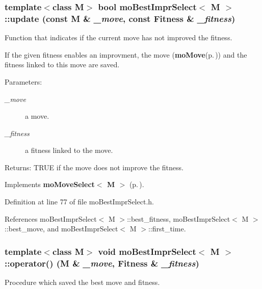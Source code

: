 \subsubsection{\setlength{\rightskip}{0pt plus 5cm}template$<$class M$>$ bool {\bf mo\-Best\-Impr\-Select}$<$ M $>$::update (const M \& {\em \_\-move}, const {\bf Fitness} \& {\em \_\-fitness})\hspace{0.3cm}{\tt  [inline, virtual]}}\label{classmo_best_impr_select_a1}


Function that indicates if the current move has not improved the fitness. 

If the given fitness enables an improvment, the move ({\bf mo\-Move}{\rm (p.\,\pageref{classmo_move})}) and the fitness linked to this move are saved.

\begin{Desc}
\item[Parameters:]
\begin{description}
\item[{\em \_\-move}]a move. \item[{\em \_\-fitness}]a fitness linked to the move. \end{description}
\end{Desc}
\begin{Desc}
\item[Returns:]TRUE if the move does not improve the fitness. \end{Desc}


Implements {\bf mo\-Move\-Select$<$ M $>$} {\rm (p.\,\pageref{classmo_move_select_a1})}.

Definition at line 77 of file mo\-Best\-Impr\-Select.h.

References mo\-Best\-Impr\-Select$<$ M $>$::best\_\-fitness, mo\-Best\-Impr\-Select$<$ M $>$::best\_\-move, and mo\-Best\-Impr\-Select$<$ M $>$::first\_\-time.
\subsubsection{\setlength{\rightskip}{0pt plus 5cm}template$<$class M$>$ void {\bf mo\-Best\-Impr\-Select}$<$ M $>$::operator() (M \& {\em \_\-move}, {\bf Fitness} \& {\em \_\-fitness})\hspace{0.3cm}{\tt  [inline]}}\label{classmo_best_impr_select_a2}


Procedure which saved the best move and fitness. 

